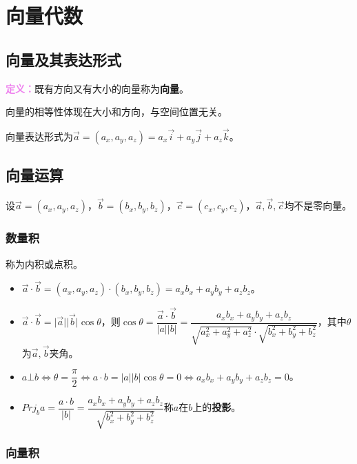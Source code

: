 \documentclass[UTF8, 12pt]{ctexart}
\begin{document}
        \section{向量代数}

        \subsection{向量及其表达形式}

        \textcolor{violet}{\textbf{定义：}}既有方向又有大小的向量称为\textbf{向量}。

        向量的相等性体现在大小和方向，与空间位置无关。

        向量表达形式为$\vec{a}=(a_x,a_y,a_z)=a_x\vec{i}+a_y\vec{j}+a_z\vec{k}$。

        \subsection{向量运算}

        设$\vec{a}=(a_x,a_y,a_z)$，$\vec{b}=(b_x,b_y,b_z)$，$\vec{c}=(c_x,c_y,c_z)$，$\vec{a},\vec{b},\vec{c}$均不是零向量。

        \subsubsection{数量积}

        称为内积或点积。

        \begin{itemize}
            \item $\vec{a}\cdot\vec{b}=(a_x,a_y,a_z)\cdot(b_x,b_y,b_z)=a_xb_x+a_yb_y+a_zb_z$。
            \item $\vec{a}\cdot\vec{b}=\vert\vec{a}\vert\vert\vec{b}\vert\cos\theta$，则$\cos\theta=\dfrac{\vec{a}\cdot\vec{b}}{\vert a\vert\vert b\vert}=\dfrac{a_xb_x+a_yb_y+a_zb_z}{\sqrt{a_x^2+a_y^2+a_z^2}\cdot\sqrt{b_x^2+b_y^2+b_z^2}}$，其中$\theta$为$\vec{a},\vec{b}$夹角。
            \item $a\bot b\Leftrightarrow\theta=\dfrac{\pi}{2}\Leftrightarrow a\cdot b=\vert a\vert\vert b\vert\cos\theta=0\Leftrightarrow a_xb_x+a_yb_y+a_zb_z=0$。
            \item $Prj_ba=\dfrac{a\cdot b}{\vert b\vert}=\dfrac{a_xb_x+a_yb_y+a_zb_z}{\sqrt{b_x^2+b_y^2+b_z^2}}$称$a$在$b$上的\textbf{投影}。
        \end{itemize}

        \subsubsection{向量积}
\end{document}
